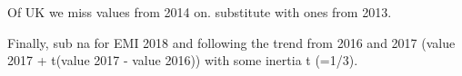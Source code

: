 \documentclass[
]{article}
\newenvironment{Shaded}{\begin{snugshade}}{\end{snugshade}}
\newcommand{\DecValTok}[1]{\textcolor[rgb]{0.00,0.00,0.81}{#1}}
\newcommand{\KeywordTok}[1]{\textcolor[rgb]{0.13,0.29,0.53}{\textbf{#1}}}
\newcommand{\NormalTok}[1]{#1}
\newcommand{\OperatorTok}[1]{\textcolor[rgb]{0.81,0.36,0.00}{\textbf{#1}}}
\newcommand{\StringTok}[1]{\textcolor[rgb]{0.31,0.60,0.02}{#1}}
\begin{document}
Of UK we miss values from 2014 on. substitute with ones from 2013.

\begin{Shaded}
\end{Shaded}

Finally, sub na for EMI 2018 and following the trend from 2016 and 2017
(value 2017 + t(value 2017 - value 2016)) with some inertia t (=1/3).
\end{document}
